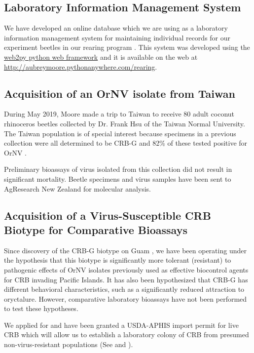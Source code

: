 \documentclass[12pt,letterpaper,english,bibliography=totocnumbered]{scrartcl}
\begin{document}
\subsection{Laboratory Information Management System}\label{lims}

We have developed an online database which we are using as a laboratory information management system for maintaining individual records for our experiment beetles in our rearing program \cite{moore_coconut_2019-1}. This system was developed using the \href{http://www.web2py.com/}{web2py python web framework} and it is available on the web at \url{http://aubreymoore.pythonanywhere.com/rearing}. 

\subsection{Acquisition of an OrNV isolate from Taiwan}

During May 2019, Moore made a trip to Taiwan to receive 80 adult coconut rhinoceros
beetles collected by Dr. Frank Hsu of the Taiwan Normal University. The Taiwan population is of special interest because specimens in a previous collection
were all determined to be CRB-G and 82\% of these tested positive for OrNV \cite{watanabe_survey_2016-1}.

Preliminary bioassays of virus isolated from this collection did not result in significant mortality. Beetle specimens and virus samples have been sent to AgResearch New Zealand for molecular analysis.

\subsection{Acquisition of a Virus-Susceptible CRB Biotype for Comparative Bioassays}

Since discovery of the CRB-G biotype on Guam \cite{marshall_new_2017-1}, we have been operating under the hypothesis that this biotype is significantly more tolerant (resistant) to pathogenic effects of OrNV isolates previously used as effective biocontrol agents for CRB invading Pacific Islands. It has also been hypothesized that CRB-G has different behavioral characteristics, such as a significantly reduced attraction to oryctalure. However, comparative laboratory bioassays have not been performed to test these hypotheses.

We applied for and have been granted a USDA-APHIS import permit for live CRB which will allow us to establish a laboratory colony of CRB from presumed non-virus-resistant populations (See \cite{moore_additional_2019} and \cite{usda-aphis_crb_2019}). 
\end{document}
